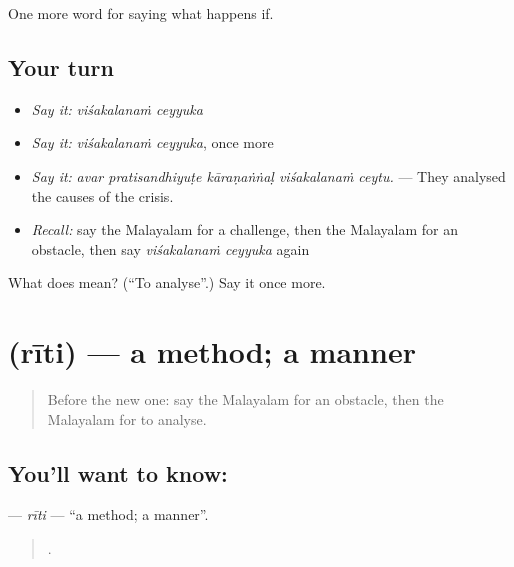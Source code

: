 \begin{grammarlens}[title={What you've built}]
One more word for saying what happens if.
\end{grammarlens}

\subsection*{Your turn}
\begin{itemize}
\raggedright
  \item \emph{Say it:} \emph{viśakalanaṁ ceyyuka}
  \item \emph{Say it:} \emph{viśakalanaṁ ceyyuka}, once more
  \item \emph{Say it:} \emph{avar pratisandhiyuṭe kāraṇaṅṅaḷ viśakalanaṁ ceytu.} — They analysed the causes of the crisis.
  \item \emph{Recall:} say the Malayalam for a challenge, then the Malayalam for an obstacle, then say \emph{viśakalanaṁ ceyyuka} again
\end{itemize}

\begin{tcolorbox}[breakable,colback=teal!4,colframe=teal!35!black,title={Before you move on}]
What does   mean? (\textquotedblleft{}To analyse\textquotedblright{}.) Say it once more.
\end{tcolorbox}
\section[\texorpdfstring{\ml{രീതി} (rīti)}{രീതി (rīti)}]{ (rīti) — a method; a manner}

\label{lesson:ML-C448-riti}



\begin{quote}
Before the new one: say the Malayalam for an obstacle, then the Malayalam for to analyse.
\end{quote}

\subsection*{You'll want to know: }
\textbf{} — \emph{rīti} — \textquotedblleft{}a method; a manner\textquotedblright{}.

\begin{quote}
   .
\end{quote}

